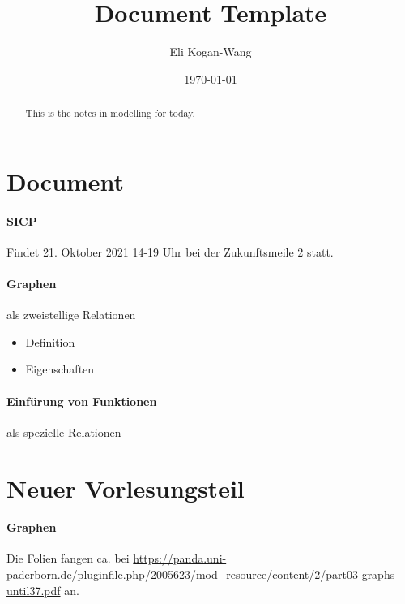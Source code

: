 \documentclass[a4paper,12pt]{article}
\title{Document Template}
\author{Eli Kogan-Wang}
\date{\today}
\begin{document}
\renewcommand{\abstractname}{Abstract}
\begin{abstract}
    This is the notes in modelling for today.
\end{abstract}
\section{Document}

\paragraph{SICP} Findet 21. Oktober 2021 14-19 Uhr bei der Zukunftsmeile 2 statt.

\paragraph{Graphen} als zweistellige Relationen

\begin{itemize}
    \item Definition
    \item Eigenschaften
\end{itemize}

\paragraph{Einfürung von Funktionen} als spezielle Relationen

\section{Neuer Vorlesungsteil}

\paragraph{Graphen} Die Folien fangen ca. bei \url{https://panda.uni-paderborn.de/pluginfile.php/2005623/mod_resource/content/2/part03-graphs-until37.pdf} an.
\end{document}
